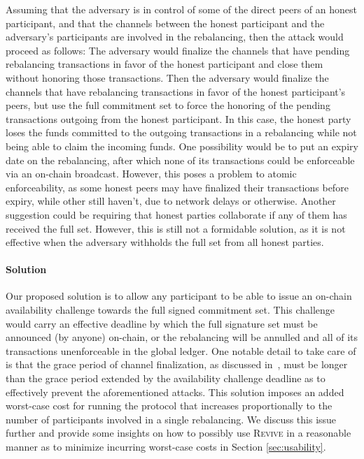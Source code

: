 \documentclass[sigconf]{acmart}
\newcommand{\name}{\textsc{Revive}\xspace}
\begin{document}
Assuming that the adversary is in control of some of the direct peers of an honest participant, and that the channels between the honest participant and the adversary's participants are involved in the rebalancing, then the attack would proceed as follows:
The adversary would finalize the channels that have pending rebalancing transactions in favor of the honest participant and close them without honoring those transactions. Then the adversary would finalize the channels that have rebalancing transactions in favor of the honest participant's peers, but use the full commitment set to force the honoring of the pending transactions outgoing from the honest participant. In this case, the honest party loses the funds committed to the outgoing transactions in a rebalancing while not being able to claim the incoming funds.
One possibility would be to put an expiry date on the rebalancing, after which none of its transactions could be enforceable via an on-chain broadcast. However, this poses a problem to atomic enforceability, as some honest peers may have finalized their transactions before expiry, while other still haven't, due to network delays or otherwise. Another suggestion could be requiring that honest parties collaborate if any of them has received the full set. However, this is still not a formidable solution, as it is not effective when the adversary withholds the full set from all honest parties.

\paragraph{Solution}
Our proposed solution is to allow any participant to be able to issue an on-chain availability challenge towards the full signed commitment set. This challenge would carry an effective deadline by which the full signature set must be announced (by anyone) on-chain, or the rebalancing will be annulled and all of its transactions unenforceable in the global ledger.
One notable detail to take care of is that the grace period of channel finalization, as discussed in~\cite{sprites}, must be longer than the grace period extended by the availability challenge deadline as to effectively prevent the aforementioned attacks.
This solution imposes an added worst-case cost for running the protocol that increases proportionally to the number of participants involved in a single rebalancing. We discuss this issue further and provide some insights on how to possibly use \name in a reasonable manner as to minimize incurring worst-case costs in Section \ref{sec:usability}.
\end{document}
